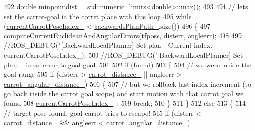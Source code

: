 \begin{DoxyCode}
492             \textcolor{keywordtype}{double} minpointdist = std::numeric\_limits<double>::max();
493 
494             \textcolor{comment}{// lets set the carrot-goal in the corret place with this loop}
495             \textcolor{keywordflow}{while} (\hyperlink{classcl__move__base__z_1_1backward__local__planner_1_1BackwardLocalPlanner_a2e8f2b78bc97f27c5fa431f3af2261ed}{currentCarrotPoseIndex\_} < 
      \hyperlink{classcl__move__base__z_1_1backward__local__planner_1_1BackwardLocalPlanner_ad9cde5c85f782cab2ddb4030e3c3f2cf}{backwardsPlanPath\_}.size())
496             \{
497                 \hyperlink{classcl__move__base__z_1_1backward__local__planner_1_1BackwardLocalPlanner_a843f030138afe0a28cf11a729fa67383}{computeCurrentEuclideanAndAngularErrors}(tfpose, 
      disterr, angleerr);
498 
499                 \textcolor{comment}{//ROS\_DEBUG("[BackwardLocalPlanner] Set plan - Current index: %
       currentCarrotPoseIndex\_);}
500                 \textcolor{comment}{//ROS\_DEBUG("[BackwardLocalPlanner] Set plan - linear error to goal %
       goal: %
501 
502                 \textcolor{keywordflow}{if} (found)
503                 \{
504                     \textcolor{comment}{// we were inside the goal range}
505                     \textcolor{keywordflow}{if} (disterr > \hyperlink{classcl__move__base__z_1_1backward__local__planner_1_1BackwardLocalPlanner_a0bbb80ce5bae865c4322869422803296}{carrot\_distance\_} || angleerr > 
      \hyperlink{classcl__move__base__z_1_1backward__local__planner_1_1BackwardLocalPlanner_a63e30befa09c4a67cf55086923b760c7}{carrot\_angular\_distance\_})
506                     \{
507                         \textcolor{comment}{// but we rollback last index increment (to go back inside the carrot goal scope)
       and start motion with that carrot goal we found}
508                         \hyperlink{classcl__move__base__z_1_1backward__local__planner_1_1BackwardLocalPlanner_a2e8f2b78bc97f27c5fa431f3af2261ed}{currentCarrotPoseIndex\_}--;
509                         \textcolor{keywordflow}{break};
510                     \}
511                 \}
512                 \textcolor{keywordflow}{else}
513                 \{
514                     \textcolor{comment}{// target pose found, goal carrot tries to escape!}
515                     \textcolor{keywordflow}{if} (disterr < \hyperlink{classcl__move__base__z_1_1backward__local__planner_1_1BackwardLocalPlanner_a0bbb80ce5bae865c4322869422803296}{carrot\_distance\_} && angleerr < 
      \hyperlink{classcl__move__base__z_1_1backward__local__planner_1_1BackwardLocalPlanner_a63e30befa09c4a67cf55086923b760c7}{carrot\_angular\_distance\_})
}
\end{DoxyCode}
